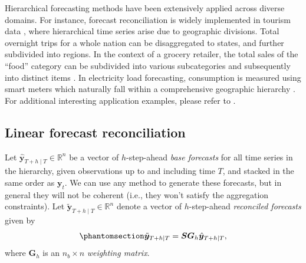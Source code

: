 \documentclass[
  11pt]{article}
\theoremstyle{plain}
\theoremstyle{remark}
\begin{document}
Hierarchical forecasting methods have been extensively applied across
diverse domains. For instance, forecast reconciliation is widely
implemented in tourism data \citep{Athanasopoulos2009-ps}, where
hierarchical time series arise due to geographic divisions. Total
overnight trips for a whole nation can be disaggregated to states, and
further subdivided into regions. In the context of a grocery retailer,
the total sales of the ``food'' category can be subdivided into various
subcategories and subsequently into distinct items
\citep{Zhang2023-op, Hollyman2021-un}. In electricity load forecasting,
consumption is measured using smart meters which naturally fall within a
comprehensive geographic hierarchy \citep{Taieb2021-tc}. For additional
interesting application examples, please refer to
\citet{Athanasopoulos2024-sm}.

\subsection{Linear forecast
reconciliation}\label{linear-forecast-reconciliation}

Let \(\hat{\bm{y}}_{T+h \mid T} \in \mathbb{R}^n\) be a vector of
\(h\)-step-ahead \emph{base forecasts} for all time series in the
hierarchy, given observations up to and including time \(T\), and
stacked in the same order as \(\bm{y}_t\). We can use any method to
generate these forecasts, but in general they will not be coherent
(i.e., they won't satisfy the aggregation constraints). Let
\(\tilde{\bm{y}}_{T+h \mid T} \in \mathbb{R}^n\) denote a vector of
\(h\)-step-ahead \emph{reconciled forecasts} given by
\begin{equation}\phantomsection\label{eq-lr}{
\tilde{\bm{y}}_{T+h \mid T} = \bm{S}\bm{G}_h\hat{\bm{y}}_{T+h \mid T},
}\end{equation} where \(\bm{G}_h\) is an \(n_b \times n\)
\emph{weighting matrix}.
\end{document}
